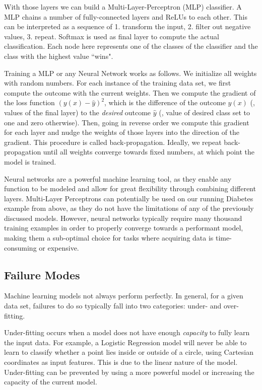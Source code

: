 With those layers we can build a Multi-Layer-Perceptron (MLP) classifier.
A MLP chains a number of fully-connected layers and ReLUs to each other.
This can be interpreted as a sequence of 1. transform the input, 2. filter out negative values, 3. repeat.
Softmax is used as final layer to compute the actual classification.
Each node here represents one of the classes of the classifier and the class with the highest value ``wins".

Training a MLP or any Neural Network works as follows.
We initialize all weights with random numbers.
For each instance of the training data set, we first compute the outcome with the current weights.
Then we compute the gradient of the loss function $(y(x) - \hat{y})^2$, which is the difference of the outcome $y(x)$ (\ie, values of the final layer) to the \emph{desired} outcome $\hat{y}$ (\ie, value of desired class set to one and zero otherwise).
Then, going in reverse order we compute this gradient for each layer and nudge the weights of those layers into the direction of the gradient.
This procedure is called back-propagation.
Ideally, we repeat back-propagation until all weights converge towards fixed numbers, at which point the model is trained.

Neural networks are a powerful machine learning tool, as they enable any function to be modeled  and allow for great flexibility through combining different layers.
Multi-Layer Perceptrons can potentially be used on our running Diabetes example from above, as they do not have the limitations of any of the previously discussed models.
However, neural networks typically require many thousand training examples in order to properly converge towards a performant model, making them a sub-optimal choice for tasks where acquiring data is time-consuming or expensive.

\subsection{Failure Modes}
Machine learning models not always perform perfectly.
In general, for a given data set, failures to do so typically fall into two categories: under- and over-fitting.

Under-fitting occurs when a model does not have enough \emph{capacity} to fully learn the input data.
For example, a Logistic Regression model will never be able to learn to classify whether a point lies inside or outside of a circle, using Cartesian coordinates as input features.
This is due to the linear nature of the model.
Under-fitting can be prevented by using a more powerful model or increasing the capacity of the current model.

